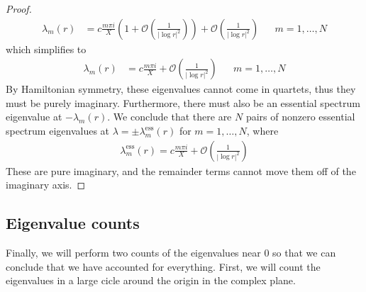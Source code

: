 \documentclass[thesis.tex]{subfiles}
\begin{document}
\begin{lemma}
\begin{proof}
\begin{align*}
\lambda_m(r) &= c \frac{m \pi i }{X} \left( 1 + \mathcal{O}\left( \frac{1}{|\log r|^2} \right)\right) + \mathcal{O}\left( \frac{1}{|\log r|^2} \right) && m = 1, \dots, N
\end{align*}
which simplifies to 
\begin{align*}
\lambda_m(r) &= c \frac{m \pi i }{X} + \mathcal{O}\left( \frac{1}{|\log r|^2} \right) && m = 1, \dots, N
\end{align*}
By Hamiltonian symmetry, these eigenvalues cannot come in quartets, thus they must be purely imaginary. Furthermore, there must also be an essential spectrum eigenvalue at $-\lambda_m(r)$. We conclude that there are $N$ pairs of nonzero essential spectrum eigenvalues at $\lambda = \pm \lambda_m^{\text{ess}}(r)$ for $m = 1, \dots, N$, where
\begin{align}
\lambda^{\text{ess}}_m(r) = c \frac{m \pi i }{X} + \mathcal{O}\left( \frac{1}{|\log r|^2} \right)
\end{align}
These are pure imaginary, and the remainder terms cannot move them off of the imaginary axis.
\end{proof}
\end{lemma}

\subsection{Eigenvalue counts}

Finally, we will perform two counts of the eigenvalues near 0 so that we can conclude that we have accounted for everything. First, we will count the eigenvalues in a large cicle around the origin in the complex plane.
\end{document}
